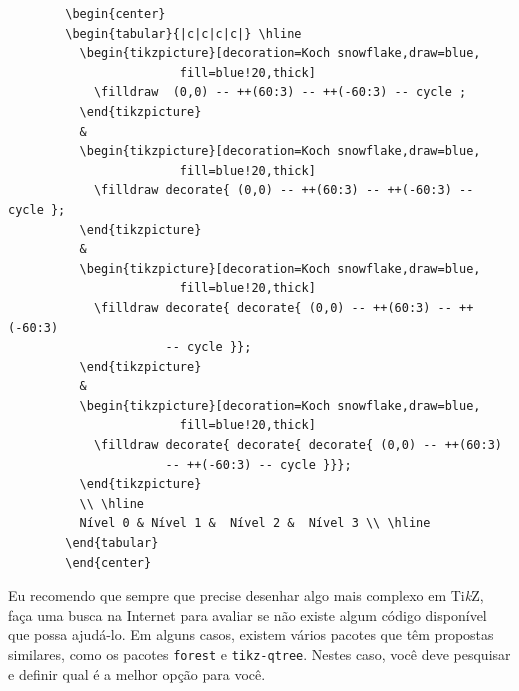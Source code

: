 \begin{itemize}
\begin{listing}[ht]
	\begin{verbatim}
		\begin{center}
		\begin{tabular}{|c|c|c|c|} \hline 
		  \begin{tikzpicture}[decoration=Koch snowflake,draw=blue,
		  	            fill=blue!20,thick]
		    \filldraw  (0,0) -- ++(60:3) -- ++(-60:3) -- cycle ;
		  \end{tikzpicture}
		  & 
		  \begin{tikzpicture}[decoration=Koch snowflake,draw=blue,
		  	            fill=blue!20,thick]
		    \filldraw decorate{ (0,0) -- ++(60:3) -- ++(-60:3) -- cycle };
		  \end{tikzpicture}
		  &  
		  \begin{tikzpicture}[decoration=Koch snowflake,draw=blue,
		  	            fill=blue!20,thick]
		    \filldraw decorate{ decorate{ (0,0) -- ++(60:3) -- ++(-60:3) 
		              -- cycle }};
		  \end{tikzpicture}
		  &  
		  \begin{tikzpicture}[decoration=Koch snowflake,draw=blue,
		  	            fill=blue!20,thick]
		    \filldraw decorate{ decorate{ decorate{ (0,0) -- ++(60:3) 
		              -- ++(-60:3) -- cycle }}};
		  \end{tikzpicture}
		  \\ \hline  
		  Nível 0 & Nível 1 &  Nível 2 &  Nível 3 \\ \hline
		\end{tabular}
		\end{center}
	\end{verbatim}
	\caption{Código \LaTeX{} usado para gerar exemplos de curvas fractais da Figura \ref{fig:kochcurve} usando a biblioteca decoration.fractal do Ti\textit{k}Z.}
	\label{cod:cod-kochcurve}
\end{listing}

\end{itemize}

Eu recomendo que sempre que precise desenhar algo mais complexo em Ti\textit{k}Z, faça uma busca na Internet para avaliar se não existe algum código disponível que possa ajudá-lo. Em alguns casos, existem vários pacotes que têm propostas similares, como os pacotes \texttt{forest} e \texttt{tikz-qtree}. Nestes caso, você deve pesquisar e definir qual é a melhor opção para você. 

